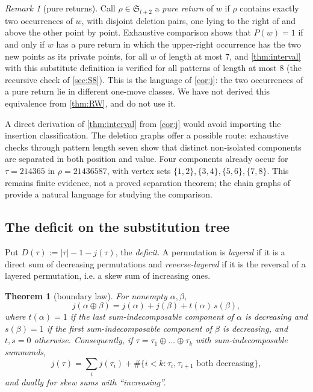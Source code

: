 \documentclass[11pt,reqno]{amsart}
\theoremstyle{plain}
\newtheorem{theorem}{Theorem}[section]
\theoremstyle{definition}
\theoremstyle{remark}
\newtheorem{remark}[remark]{Remark}
\newcommand{\Sym}{\mathfrak{S}}
\begin{document}
\begin{remark}[pure returns]\label{rem:pure}
Call $\rho\in\Sym_{l+2}$ a \emph{pure return} of $w$ if $\rho$ contains exactly two occurrences of $w$, with disjoint deletion pairs, one lying to the right of and above the other point by point. Exhaustive comparison shows that $P(w)=1$ if and only if $w$ has a pure return in which the upper-right occurrence has the two new points as its private points, for all $w$ of length at most $7$, and \cref{thm:interval} with this substitute definition is verified for all patterns of length at most $8$ (the recursive check of \cref{sec:S8}). This is the language of \cref{cor:j}: the two occurrences of a pure return lie in different one-move classes. We have not derived this equivalence from \cref{thm:RW}, and do not use it.
\end{remark}

A direct derivation of \cref{thm:interval} from \cref{cor:j} would avoid
importing the insertion classification. The deletion graphs offer a
possible route: exhaustive checks through pattern length seven show that
distinct non-isolated components are separated in both position and
value. Four components already occur for $\tau=214365$ in
$\rho=21436587$, with vertex sets $\{1,2\},\{3,4\},\{5,6\},\{7,8\}$.
This remains finite evidence, not a proved separation theorem; the chain
graphs of \cite[preprint, \S2.1]{BHT2018} provide a natural language for
studying the comparison.

\subsection{The deficit on the substitution tree}\label{sec:deficit}

Put $D(\tau):=|\tau|-1-j(\tau)$, the \emph{deficit}. A permutation is \emph{layered} if it is a direct sum of decreasing permutations and \emph{reverse-layered} if it is the reversal of a layered permutation, i.e. a skew sum of increasing ones.

\begin{theorem}[boundary law]\label{thm:boundary}
For nonempty $\alpha,\beta$,
\begin{equation}\label{eq:boundary}
j(\alpha\oplus\beta)=j(\alpha)+j(\beta)+t(\alpha)\,s(\beta),
\end{equation}
where $t(\alpha)=1$ if the last sum-indecomposable component of $\alpha$ is decreasing and $s(\beta)=1$ if the first sum-indecomposable component of $\beta$ is decreasing, and $t,s=0$ otherwise. Consequently, if $\tau=\tau_1\oplus\dots\oplus\tau_k$ with sum-indecomposable summands,
\begin{equation}\label{eq:sumlaw}
j(\tau)=\sum_i j(\tau_i)+\#\{i<k:\tau_i,\tau_{i+1}\text{ both decreasing}\},
\end{equation}
and dually for skew sums with ``increasing''.
\end{theorem}
\end{document}
